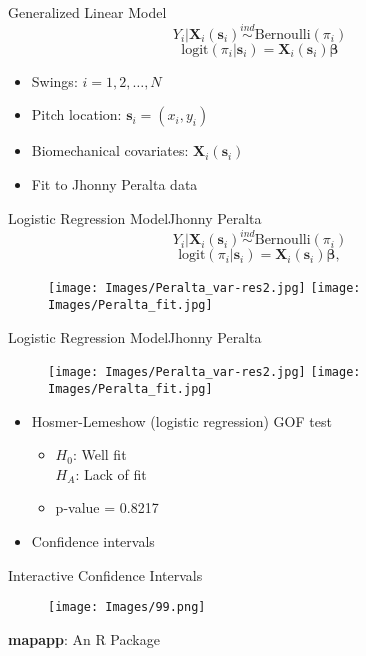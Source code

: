 \documentclass{beamer}
\begin{document}
\begin{frame}{Generalized Linear Model}{}
$$Y_{i}|\mathbf{X}_{i}(\mathbf{s}_{i}) \stackrel{ind}{\sim} \mbox{Bernoulli}(\pi_{i}) $$
$$ \text{logit}(\pi_{i}|\pmb{s}_{i}) = \mathbf{X}_{i}(\mathbf{s}_{i})\pmb{\beta} $$
\begin{itemize}
  \addtolength{\itemsep}{0.5\baselineskip}
\item Swings: $i = 1,2,\ldots, N$
\item Pitch location: $\mathbf{s}_{i} = (x_{i},y_{i})$
\item Biomechanical covariates: $\mathbf{X}_{i}(\mathbf{s}_{i})$
\item Fit to Jhonny Peralta data
\end{itemize}

\end{frame}

\begin{frame}{Logistic Regression Model}{Jhonny Peralta} %
$$Y_{i}|\mathbf{X}_{i}(\mathbf{s}_{i}) \stackrel{ind}{\sim} \mbox{Bernoulli}(\pi_{i}) $$
$$ \text{logit}(\pi_{i}|\pmb{s}_{i}) = \mathbf{X}_{i}(\mathbf{s}_{i})\pmb{\beta}, $$
  \begin{figure}[H]
	\centering
	\texttt{[image: Images/Peralta\_var-res2.jpg]}
	\texttt{[image: Images/Peralta\_fit.jpg]}
	\end{figure}
\end{frame}

\begin{frame}{Logistic Regression Model}{Jhonny Peralta} %
  \begin{figure}[H]
	\centering
	\texttt{[image: Images/Peralta\_var-res2.jpg]}
	\texttt{[image: Images/Peralta\_fit.jpg]}
	\end{figure}
\begin{itemize}
\addtolength{\itemsep}{0.5\baselineskip}
\item Hosmer-Lemeshow (logistic regression) GOF test
  \begin{itemize}
  \addtolength{\itemsep}{0.5\baselineskip}
  \item $H_0$: Well fit \\ $H_A$: Lack of fit
  \item p-value = 0.8217
  \end{itemize}
\item Confidence intervals
\end{itemize}
\end{frame}

\begin{frame}{Interactive Confidence Intervals}{} %
  \begin{figure}[H]
	\centering
	\texttt{[image: Images/99.png]}
	\end{figure}
{\bf mapapp}: An R Package
\end{frame}
\end{document}
